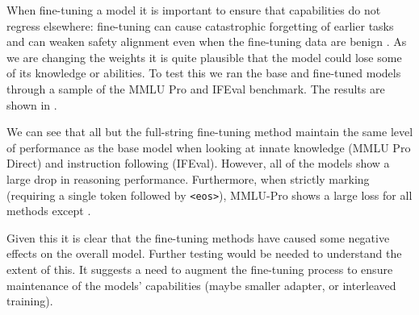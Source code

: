 When fine-tuning a model it is important to ensure that capabilities do not regress elsewhere: fine-tuning can cause catastrophic forgetting of earlier tasks \cite{kirkpatrickOvercomingCatastrophicForgetting2017} and can weaken safety alignment even when the fine-tuning data are benign \cite{qiSafetyAlignmentShould2024}. As we are changing the weights it is quite plausible that the model could lose some of its knowledge or abilities. To test this we ran the base and fine-tuned models through a sample of the MMLU Pro and IFEval benchmark. The results are shown in . 

We can see that all but the full-string fine-tuning method maintain the same level of performance as the base model when looking at innate knowledge (MMLU Pro Direct) and instruction following (IFEval). However, all of the models show a large drop in reasoning performance. Furthermore, when strictly marking (requiring a single token followed by \texttt{<eos>}), MMLU-Pro shows a large loss for all methods except .

Given this it is clear that the fine-tuning methods have caused some negative effects on the overall model. Further testing would be needed to understand the extent of this. It suggests a need to augment the fine-tuning process to ensure maintenance of the models' capabilities (maybe smaller adapter, or interleaved training).

